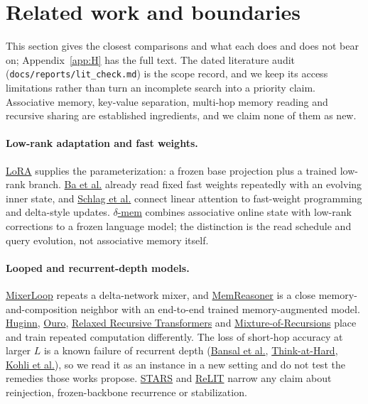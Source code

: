 \section{Related work and boundaries}
\label{sec:related}

This section gives the closest comparisons and what each does and does not bear on; Appendix~\ref{app:H} has the full text.
The dated literature audit (\texttt{docs/reports/lit\_check.md}) is the scope record, and we keep its access limitations rather than turn an incomplete search into a priority claim.
Associative memory, key-value separation, multi-hop memory reading and recursive sharing are established ingredients, and we claim none of them as new.

\paragraph{Low-rank adaptation and fast weights.}
\href{https://arxiv.org/abs/2106.09685}{LoRA} supplies the parameterization: a frozen base projection plus a trained low-rank branch.
\href{https://arxiv.org/html/1610.06258v3}{Ba et al.} already read fixed fast weights repeatedly with an evolving inner state, and \href{https://proceedings.mlr.press/v139/schlag21a.html}{Schlag et al.} connect linear attention to fast-weight programming and delta-style updates.
\href{https://arxiv.org/html/2605.12357v2}{$\delta$-mem} combines associative online state with low-rank corrections to a frozen language model; the distinction is the read schedule and query evolution, not associative memory itself.

\paragraph{Looped and recurrent-depth models.}
\href{https://arxiv.org/abs/2608.18230}{MixerLoop} repeats a delta-network mixer, and \href{https://arxiv.org/abs/2503.07903}{MemReasoner} is a close memory-and-composition neighbor with an end-to-end trained memory-augmented model.
\href{https://arxiv.org/html/2502.05171v2}{Huginn}, \href{https://arxiv.org/pdf/2510.25741v6}{Ouro}, \href{https://arxiv.org/html/2410.20672v3}{Relaxed Recursive Transformers} and \href{https://arxiv.org/html/2507.10524v3}{Mixture-of-Recursions} place and train repeated computation differently.
The loss of short-hop accuracy at larger $L$ is a known failure of recurrent depth (\href{https://arxiv.org/abs/2202.05826}{Bansal et al.}, \href{https://arxiv.org/abs/2511.08577}{Think-at-Hard}, \href{https://arxiv.org/abs/2604.07822}{Kohli et al.}), so we read it as an instance in a new setting and do not test the remedies those works propose.  %
\href{https://arxiv.org/html/2605.26733v1}{STARS} and \href{https://arxiv.org/html/2608.08113v1}{ReLIT} narrow any claim about reinjection, frozen-backbone recurrence or stabilization.

